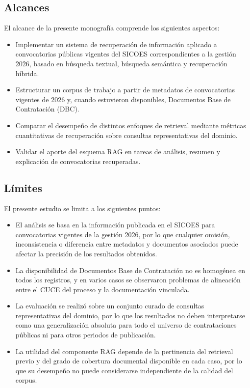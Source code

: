 \subsection{Alcances}

El alcance de la presente monografía comprende los siguientes aspectos:

\begin{itemize}
    \item Implementar un sistema de recuperación de información aplicado a convocatorias públicas vigentes del SICOES correspondientes a la gestión 2026, basado en búsqueda textual, búsqueda semántica y recuperación híbrida.
    \item Estructurar un corpus de trabajo a partir de metadatos de convocatorias vigentes de 2026 y, cuando estuvieron disponibles, Documentos Base de Contratación (DBC).
    \item Comparar el desempeño de distintos enfoques de retrieval mediante métricas cuantitativas de recuperación sobre consultas representativas del dominio.
    \item Validar el aporte del esquema RAG en tareas de análisis, resumen y explicación de convocatorias recuperadas.
\end{itemize}

\subsection{Límites}

El presente estudio se limita a los siguientes puntos:

\begin{itemize}
    \item El análisis se basa en la información publicada en el SICOES para convocatorias vigentes de la gestión 2026, por lo que cualquier omisión, inconsistencia o diferencia entre metadatos y documentos asociados puede afectar la precisión de los resultados obtenidos.
    \item La disponibilidad de Documentos Base de Contratación no es homogénea en todos los registros, y en varios casos se observaron problemas de alineación entre el CUCE del proceso y la documentación vinculada.
    \item La evaluación se realizó sobre un conjunto curado de consultas representativas del dominio, por lo que los resultados no deben interpretarse como una generalización absoluta para todo el universo de contrataciones públicas ni para otros periodos de publicación.
    \item La utilidad del componente RAG depende de la pertinencia del retrieval previo y del grado de cobertura documental disponible en cada caso, por lo que su desempeño no puede considerarse independiente de la calidad del corpus.
\end{itemize}
